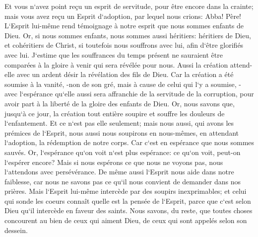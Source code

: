 \verse Et vous n`avez point reçu un esprit de servitude, pour être encore dans la crainte; mais vous avez reçu un Esprit d`adoption, par lequel nous crions: Abba! Père! 
\verse L`Esprit lui-même rend témoignage à notre esprit que nous sommes enfants de Dieu. 
\verse Or, si nous sommes enfants, nous sommes aussi héritiers: héritiers de Dieu, et cohéritiers de Christ, si toutefois nous souffrons avec lui, afin d`être glorifiés avec lui. 
\verse J`estime que les souffrances du temps présent ne sauraient être comparées à la gloire à venir qui sera révélée pour nous. 
\verse Aussi la création attend-elle avec un ardent désir la révélation des fils de Dieu. 
\verse Car la création a été soumise à la vanité, -non de son gré, mais à cause de celui qui l`y a soumise, - 
\verse avec l`espérance qu`elle aussi sera affranchie de la servitude de la corruption, pour avoir part à la liberté de la gloire des enfants de Dieu. 
\verse Or, nous savons que, jusqu`à ce jour, la création tout entière soupire et souffre les douleurs de l`enfantement. 
\verse Et ce n`est pas elle seulement; mais nous aussi, qui avons les prémices de l`Esprit, nous aussi nous soupirons en nous-mêmes, en attendant l`adoption, la rédemption de notre corps. 
\verse Car c`est en espérance que nous sommes sauvés. Or, l`espérance qu`on voit n`est plus espérance: ce qu`on voit, peut-on l`espérer encore? 
\verse Mais si nous espérons ce que nous ne voyons pas, nous l`attendons avec persévérance. 
\verse De même aussi l`Esprit nous aide dans notre faiblesse, car nous ne savons pas ce qu`il nous convient de demander dans nos prières. Mais l`Esprit lui-même intercède par des soupirs inexprimables; 
\verse et celui qui sonde les coeurs connaît quelle est la pensée de l`Esprit, parce que c`est selon Dieu qu`il intercède en faveur des saints. 
\verse Nous savons, du reste, que toutes choses concourent au bien de ceux qui aiment Dieu, de ceux qui sont appelés selon son dessein. 
